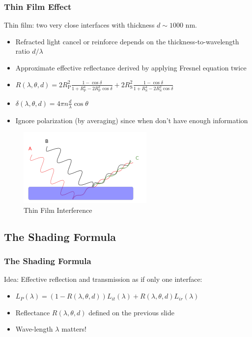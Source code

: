 \documentclass{beamer}
\begin{document}

\begin{frame}
	\frametitle{Thin Film Effect}
	Thin film: two very close interfaces with thickness $d \sim 1000$ nm.
	\begin{itemize}
		\item Refracted light cancel or reinforce depends on the thickness-to-wavelength ratio $d/\lambda$
		\item Approximate effective reflectance derived by applying Fresnel equation twice
		\item $	R(\lambda, \theta, d) = 2R_{\textrm{P}}^2\frac{1-\cos\delta}{1+R_{\textrm{P}}^4-2R_{\textrm{P}}^2\cos\delta}+2R_{\textrm{S}}^2\frac{1-\cos\delta}{1+R_{\textrm{S}}^4-2R_{\textrm{S}}^2\cos\delta}$
		\item $ \delta(\lambda, \theta, d) = 4\pi n\frac{d}{\lambda}\cos\theta $
		\item Ignore polarization (by averaging) since when don't have enough information
	\end{itemize}
	\begin{figure}
	\centering
	\includegraphics[width=0.3\linewidth]{thin_film_theory.png}
	\caption{Thin Film Interference}
	\end{figure}
\end{frame}


\subsection{The Shading Formula}

\begin{frame}
	\frametitle{The Shading Formula}
	Idea: Effective reflection and transmission as if only one interface:
	\begin{itemize}
		\item $	L_P(\lambda) = (1-R(\lambda, \theta, d))L_{it}(\lambda) + R(\lambda, \theta, d)L_{ir}(\lambda) $
		\item Reflectance $R(\lambda, \theta, d)$ defined on the previous slide
		\item Wave-length $\lambda$ matters!
	\end{itemize}
\end{frame}
\end{document}
